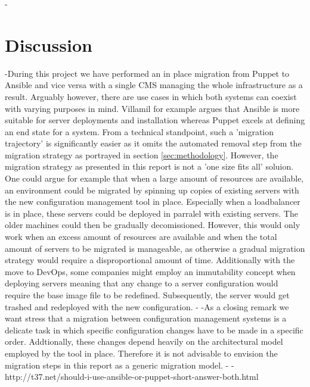 -\section{Discussion}\label{sec:discussion}
-During this project we have performed an in place migration from Puppet to Ansible and vice versa with a single CMS managing the whole infrastructure as a result. Arguably however, there are use cases in which both systems can coexist with varying purposes in mind. Villamil \cite{} for example argues that Ansible is more suitable for server deployments and installation whereas Puppet excels at defining an end state for a system. From a technical standpoint, such a 'migration trajectory' is significantly easier as it omits the automated removal step from the migration strategy as portrayed in section \ref{sec:methodology}. However, the migration strategy as presented in this report is not a 'one size fits all' soluion. One could argue for example that when a large amount of resources are available, an environment could be migrated by spinning up copies of existing servers with the new configuration management tool in place. Especially when a loadbalancer is in place, these servers could be deployed in parralel with existing servers. The older machines could then be gradually decomissioned. However, this would only work when an excess amount of resources are available and when the total amount of servers to be migrated is manageable, as otherwise a gradual migration strategy would require a disproportional amount of time. Additionally with the move to DevOps, some companies might employ an immutability concept when deploying servers meaning that any change to a server configuration would require the base image file to be redefined. Subsequently, the server would get trashed and redeployed with the new configuration. 
-
-As a closing remark we want stress that a migration between configuration management systems is a delicate task in which specific configuration changes have to be made in a specific order. Addtionally, these changes depend heavily on the architectural model employed by the tool in place. Therefore it is not advisable to envision the migration steps in this report as a generic migration model.  
-
-http://t37.net/should-i-use-ansible-or-puppet-short-answer-both.html
